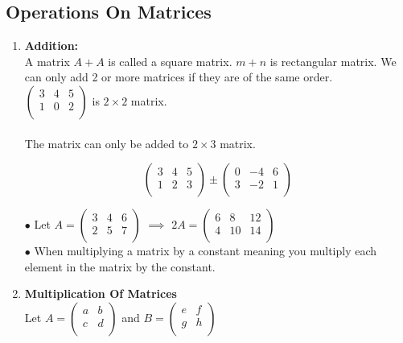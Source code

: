 \documentclass[11pt,a4paper]{article}
\begin{document}
\subsection{Operations On Matrices}
\begin{enumerate}
\item \textbf{Addition:}\\
A matrix $A + A $ is called a square matrix. $m+n$ is rectangular matrix. We can only add 2 or more matrices if they are of the same order.\\ $
\begin{pmatrix}
3 & 4 & 5\\
1 & 0 & 2\\
\end{pmatrix}
$ is $2\times 2$ matrix.\\\\ The matrix can only be added to $2\times 3$ matrix.

$$
\begin{pmatrix}
3 & 4 & 5\\
1 & 2 & 3\\
\end{pmatrix}
\pm
\begin{pmatrix}
0 & -4 & 6\\
3 & -2 & 1\\
\end{pmatrix}
$$

$\bullet$ Let $A=
\begin{pmatrix}
3 & 4 & 6\\
2 & 5 & 7\\
\end{pmatrix}
$ $\implies$ $2A=
\begin{pmatrix}
6 & 8 & 12\\
4 & 10 & 14\\
\end{pmatrix}
$\\

$\bullet$ When multiplying a matrix by a constant meaning you multiply each element in the matrix by the constant.\\


\item \textbf{Multiplication Of Matrices}\\
Let $A=
\begin{pmatrix}
a & b\\
c & d\\
\end{pmatrix}
$ and $B=
\begin{pmatrix}
e & f\\
g & h\\
\end{pmatrix}
$\\


\end{enumerate}
\end{document}
